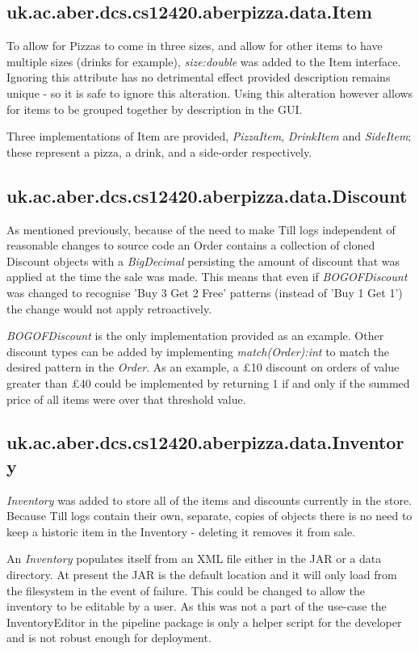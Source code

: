 \documentclass[11pt]{article} %
\begin{document}
\subsection{uk.ac.aber.dcs.cs12420.aberpizza.data.Item}
To allow for Pizzas to come in three sizes, and allow for other items to have multiple sizes (drinks for example), \emph{size:double} was added to the Item interface. Ignoring this attribute has no detrimental effect provided description remains unique - so it is safe to ignore this alteration. Using this alteration however allows for items to be grouped together by description in the GUI.

Three implementations of Item are provided, \emph{PizzaItem}, \emph{DrinkItem} and \emph{SideItem}; these represent a pizza, a drink, and a side-order respectively.

\subsection{uk.ac.aber.dcs.cs12420.aberpizza.data.Discount}
As mentioned previously, because of the need to make Till logs independent of reasonable changes to source code an Order contains a collection of cloned Discount objects with a \emph{BigDecimal} persisting the amount of discount that was applied at the time the sale was made. This means that even if \emph{BOGOFDiscount} was changed to recognise 'Buy 3 Get 2 Free' patterns (instead of 'Buy 1 Get 1') the change would not apply retroactively.

\emph{BOGOFDiscount} is the only implementation provided as an example. Other discount types can be added by implementing \emph{match(Order):int} to match the desired pattern in the \emph{Order}. As an example, a £10 discount on orders of value greater than £40 could be implemented by returning 1 if and only if the summed price of all items were over that threshold value.

\subsection{uk.ac.aber.dcs.cs12420.aberpizza.data.Inventory}
\emph{Inventory} was added to store all of the items and discounts currently in the store. Because Till logs contain their own, separate, copies of objects there is no need to keep a historic item in the Inventory - deleting it removes it from sale.

An \emph{Inventory} populates itself from an XML file either in the JAR or a data directory. At present the JAR is the default location and it will only load from the filesystem in the event of failure. This could be changed to allow the inventory to be editable by a user. As this was not a part of the use-case the InventoryEditor in the pipeline package is only a helper script for the developer and is not robust enough for deployment.
\end{document}
